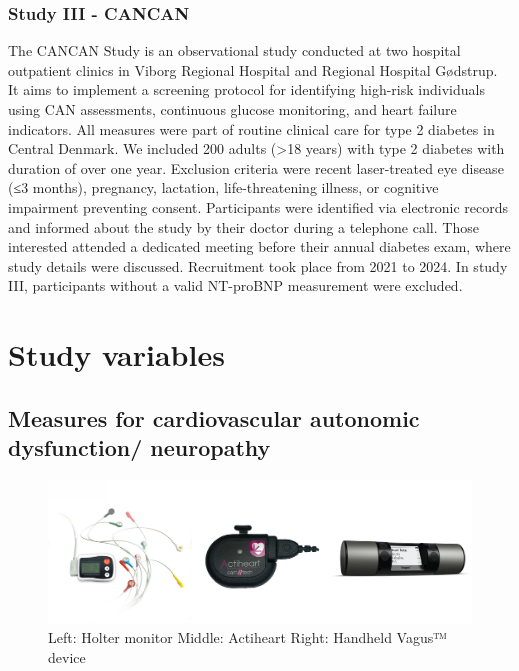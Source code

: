 \documentclass[
  a4paper,
  headsepline=true,
  open=any]{scrbook}
\begin{document}
\hypertarget{study-iii---cancan}{%
\subsubsection{Study III - CANCAN}\label{study-iii---cancan}}

The CANCAN Study is an observational study conducted at two hospital
outpatient clinics in Viborg Regional Hospital and Regional Hospital
Gødstrup. It aims to implement a screening protocol for identifying
high-risk individuals using CAN assessments, continuous glucose
monitoring, and heart failure indicators. All measures were part of
routine clinical care for type 2 diabetes in Central Denmark. We
included 200 adults (\textgreater18 years) with type 2 diabetes with
duration of over one year. Exclusion criteria were recent laser-treated
eye disease (≤3 months), pregnancy, lactation, life-threatening illness,
or cognitive impairment preventing consent. Participants were identified
via electronic records and informed about the study by their doctor
during a telephone call. Those interested attended a dedicated meeting
before their annual diabetes exam, where study details were discussed.
Recruitment took place from 2021 to 2024. In study III, participants
without a valid NT-proBNP measurement were excluded.

\hypertarget{study-variables}{%
\section{Study variables}\label{study-variables}}

\hypertarget{measures-for-cardiovascular-autonomic-dysfunction-neuropathy}{%
\subsection{Measures for cardiovascular autonomic dysfunction/
neuropathy}\label{measures-for-cardiovascular-autonomic-dysfunction-neuropathy}}

\begin{figure}

{\centering \includegraphics[width=5in,height=\textheight]{images/can_tools.pdf}

}

\caption{Left: Holter monitor Middle: Actiheart Right: Handheld Vagus™
device}

\end{figure}
\end{document}
